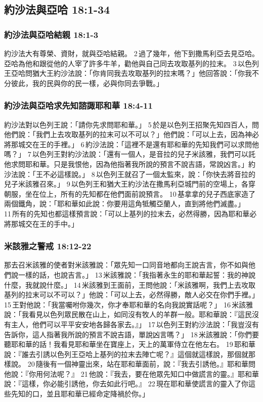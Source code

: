 \subsection{約沙法與亞哈 18:1-34}
\subsubsection{約沙法與亞哈結親 18:1-3}
約沙法大有尊榮、資財，就與亞哈結親。 2 過了幾年，他下到撒馬利亞去見亞哈。亞哈為他和跟從他的人宰了許多牛羊，勸他與自己同去攻取基列的拉末。 3 以色列王亞哈問猶大王約沙法說：「你肯同我去攻取基列的拉末嗎？」他回答說：「你我不分彼此，我的民與你的民一樣，必與你同去爭戰。」

\subsubsection{約沙法與亞哈求先知諮諏耶和華 18:4-11}
約沙法對以色列王說：「請你先求問耶和華。」 5 於是以色列王招聚先知四百人，問他們說：「我們上去攻取基列的拉末可以不可以？」他們說：「可以上去，因為神必將那城交在王的手裡。」 6 約沙法說：「這裡不是還有耶和華的先知我們可以求問他嗎？」 7 以色列王對約沙法說：「還有一個人，是音拉的兒子米該雅，我們可以託他求問耶和華。只是我恨他，因為他指著我所說的預言不說吉語，常說凶言。」約沙法說：「王不必這樣說。」 8 以色列王就召了一個太監來，說：「你快去將音拉的兒子米該雅召來。」 9 以色列王和猶大王約沙法在撒馬利亞城門前的空場上，各穿朝服，坐在位上，所有的先知都在他們面前說預言。 10 基拿拿的兒子西底家造了兩個鐵角，說：「耶和華如此說：你要用這角牴觸亞蘭人，直到將他們滅盡。」 11 所有的先知也都這樣預言說：「可以上基列的拉末去，必然得勝，因為耶和華必將那城交在王的手中。」

\subsubsection{米該雅之警戒 18:12-22}
那去召米該雅的使者對米該雅說：「眾先知一口同音地都向王說吉言，你不如與他們說一樣的話，也說吉言。」 13 米該雅說：「我指著永生的耶和華起誓：我的神說什麼，我就說什麼。」 14 米該雅到王面前，王問他說：「米該雅啊，我們上去攻取基列的拉末可以不可以？」他說：「可以上去，必然得勝，敵人必交在你們手裡。」 15 王對他說：「我當囑咐你幾次，你才奉耶和華的名向我說實話呢？」 16 米該雅說：「我看見以色列眾民散在山上，如同沒有牧人的羊群一般。耶和華說：『這民沒有主人，他們可以平平安安地各歸各家去。』」 17 以色列王對約沙法說：「我豈沒有告訴你，這人指著我所說的預言不說吉語，單說凶言嗎？」 18 米該雅說：「你們要聽耶和華的話！我看見耶和華坐在寶座上，天上的萬軍侍立在他左右。 19 耶和華說：『誰去引誘以色列王亞哈上基列的拉末去陣亡呢？』這個就這樣說，那個就那樣說。 20 隨後有一個神靈出來，站在耶和華面前，說：『我去引誘他。』耶和華問他說：『你用何法呢？』 21 他說：『我去，要在他眾先知口中做謊言的靈。』耶和華說：『這樣，你必能引誘他，你去如此行吧。』 22 現在耶和華使謊言的靈入了你這些先知的口，並且耶和華已經命定降禍於你。」


